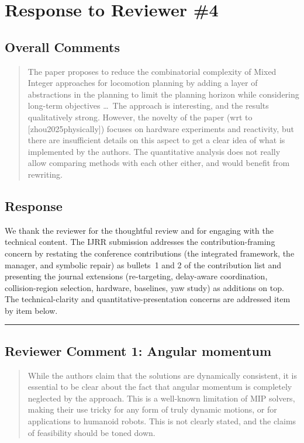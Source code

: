 \section{Response to Reviewer \#4}
\subsection*{Overall Comments}
\begin{mdframed}
\begin{quote}
The paper proposes to reduce the combinatorial complexity of Mixed Integer approaches for locomotion planning by adding a layer of abstractions in the planning to limit the planning horizon while considering long-term objectives \ldots\ The approach is interesting, and the results qualitatively strong. However, the novelty of the paper (wrt to [zhou2025physically]) focuses on hardware experiments and reactivity, but there are insufficient details on this aspect to get a clear idea of what is implemented by the authors. The quantitative analysis does not really allow comparing methods with each other either, and would benefit from rewriting.
\end{quote}
\end{mdframed}

\subsection{Response}
We thank the reviewer for the thoughtful review and for engaging with the technical content. The IJRR submission addresses the contribution-framing concern by restating the conference contributions (the integrated framework, the manager, and symbolic repair) as bullets~1 and 2 of the contribution list and presenting the journal extensions (re-targeting, delay-aware coordination, collision-region selection, hardware, baselines, yaw study) as additions on top. The technical-clarity and quantitative-presentation concerns are addressed item by item below.

\noindent\rule{17cm}{2.0pt}

\subsection{Reviewer Comment 1: Angular momentum}
\begin{mdframed}
\begin{quote}
While the authors claim that the solutions are dynamically consistent, it is essential to be clear about the fact that angular momentum is completely neglected by the approach. This is a well-known limitation of MIP solvers, making their use tricky for any form of truly dynamic motions, or for applications to humanoid robots. This is not clearly stated, and the claims of feasibility should be toned down.
\end{quote}
\end{mdframed}

